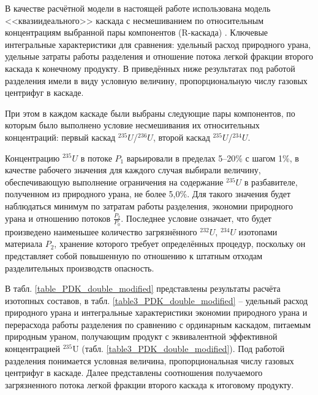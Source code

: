 В качестве расчётной модели в настоящей работе использована модель <<квазиидеального>> каскада \cite{sazykinKvaziidealnyeKaskadyDlya2000} с несмешиванием по относительным концентрациям выбранной пары компонентов (R-каскада) \cite{sulaberidzeTeoriyaKaskadovDlya2011}.
Ключевые интегральные характеристики для сравнения: удельный расход природного урана, удельные затраты работы разделения и отношение потока легкой фракции второго каскада к конечному продукту. В приведённых ниже результатах под работой разделения имели в виду условную величину, пропорциональную числу газовых центрифуг в каскаде. 

При этом в каждом каскаде были выбраны следующие пары компонентов, по которым было выполнено условие несмешивания их относительных концентраций: первый каскад $^{235}U$/$^{236}U$, второй каскад $^{235}U$/$^{234}U$.

Концентрацию $^{235}U$ в потоке $P_1$ варьировали в пределах 5--20\% с шагом 1\%, в качестве рабочего значения для каждого случая выбирали величину, обеспечивающую выполнение ограничения на содержание $^{235}U$ в разбавителе, полученном из природного урана, не более 5,0\%. Для такого значения будет наблюдаться минимум по затратам работы разделения, экономии природного урана и отношению потоков $\frac{P_2}{P_0}$. Последнее условие означает, что будет произведено наименьшее количество загрязнённого $^{232}U$, $^{234}U$ изотопами материала $P_2$, хранение которого требует определённых процедур, поскольку он представляет собой повышенную по отношению к штатным отходам разделительных производств опасность.

В табл. \ref{table_PDK_double_modified} представлены результаты расчёта изотопных составов,
в табл. \ref{table3_PDK_double_modified} -- удельный расход природного урана и интегральные характеристики экономии природного урана и перерасхода работы разделения по сравнению с ординарным каскадом, питаемым природным ураном, получающим продукт с эквивалентной эффективной концентрацией $^{235}$U (табл. \ref{table3_PDK_double_modified}). Под работой разделения понимается условная величина, пропорциональная числу газовых центрифуг в каскаде.
 Далее представлены соотношения получаемого загрязненного потока легкой фракции второго каскада к итоговому продукту.

